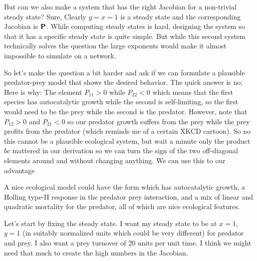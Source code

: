 But can we also make a system that has the right Jacobian for a non-trivial steady state? Sure, 
Clearly $y=x=1$ is a steady state and the corresponding Jacobian is $\bf P$. While computing steady states is hard, designing the system so that it has a specific steady state is quite simple. But while this second system technically solves the question the large exponents would make it almost impossible to simulate on a network. 

So let's make the question a bit harder and ask if we can formulate a plausible predator-prey model that shows the desired behavior. The quick answer is no; Here is why: The element $P_{11}>0$ while $P_{22}<0$ which means that the first species has autocatalytic growth while the second is self-limiting, so the first would need to be the prey while the second is the predator. However, note that $P_{12}>0$ and $P_{21}<0$ so our predator growth suffers from the prey while the prey profits from the predator (which reminds me of a certain XKCD cartoon). So no this cannot be a plausible ecological system, but wait a minute only the product $bc$ mattered in our derivation so we can turn the sign of the two off-diagonal elements around and without changing anything. We can use this to our advantage

A nice ecological model could have the form 
which has autocatalytic growth, a Holling type-II response in the predator prey interaction, and a mix of linear and quadratic mortality for the predator, all of which are nice ecological features. 

Let's start by fixing the steady state. I want my steady state to be at $x=1$, $y=1$ (in suitably normalized units which could be very different) for predator and prey. I also want a prey turnover of 20 units per unit time. I think we might need that much to create the high numbers in the Jacobian. 

